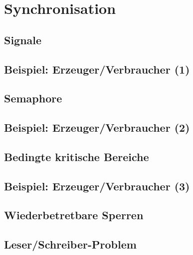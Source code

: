 \chapter{Synchronisation}

\section{Signale}

\section{Beispiel: Erzeuger/Verbraucher (1)}

\section{Semaphore}

\section{Beispiel: Erzeuger/Verbraucher (2)}

\section{Bedingte kritische Bereiche}

\section{Beispiel: Erzeuger/Verbraucher (3)}

\section{Wiederbetretbare Sperren}

\section{Leser/Schreiber-Problem}